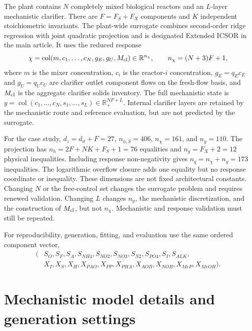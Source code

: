 \documentclass[a4paper,fleqn]{cas-sc}
\newcommand{\R}{\mathbb{R}}
\newcommand{\col}{\operatorname{col}}
\begin{document}
The plant contains $N$ completely mixed biological reactors and an $L$-layer mechanistic clarifier. There are $F=F_S+F_X$ components and $K$ independent stoichiometric invariants. The plant-wide surrogate combines second-order ridge regression with joint quadratic projection and is designated Extended ICSOR in the main article. It uses the reduced response
\begin{equation}
\chi=\col(m,c_1,\ldots,c_N,g_E,g_U,M_{\rm cl})\in\R^{n_\chi},\qquad n_\chi=(N+3)F+1,
\label{eq:Sresponse}
\end{equation}
where $m$ is the mixer concentration, $c_i$ is the reactor-$i$ concentration, $g_E=q_Ec_E$ and $g_U=q_Uc_U$ are clarifier outlet component flows on the fresh-flow basis, and $M_{\rm cl}$ is the aggregate clarifier solids inventory. The full mechanistic state is $y=\col(c_1,\ldots,c_N,s_1,\ldots,s_L)\in\R_+^{NF+L}$. Internal clarifier layers are retained by the mechanistic route and reference evaluation, but are not predicted by the surrogate.

For the case study, $d_z=d_\vartheta+F=27$, $n_{\phi,S}=406$, $n_\chi=161$, and $n_y=110$. The projection has $n_h=2F+NK+F_S+1=76$ equalities and $n_g=F_X+2=12$ physical inequalities. Including response non-negativity gives $n_q=n_\chi+n_g=173$ inequalities. The logarithmic overflow closure adds one equality but no response coordinate or inequality. These dimensions are not fixed architectural constants. Changing $N$ or the free-control set changes the surrogate problem and requires renewed validation. Changing $L$ changes $n_y$, the mechanistic discretization, and the construction of $M_{\rm cl}$, but not $n_\chi$. Mechanistic and response validation must still be repeated.

For reproducibility, generation, fitting, and evaluation use the same ordered component vector,
\begin{equation}
\begin{split}
(&S_O,S_F,S_A,S_{NH4},S_{NO2},S_{NO3},S_{N2},S_{PO4},S_I,S_{ALK},\\
&X_I,X_S,X_H,X_{PAO},X_{PP},X_{PHA},X_{AOB},X_{NOB},X_{MeP},X_{MeOH}).
\end{split}
\label{eq:Scomponents}
\end{equation}

\section{Mechanistic model details and generation settings}
\end{document}
